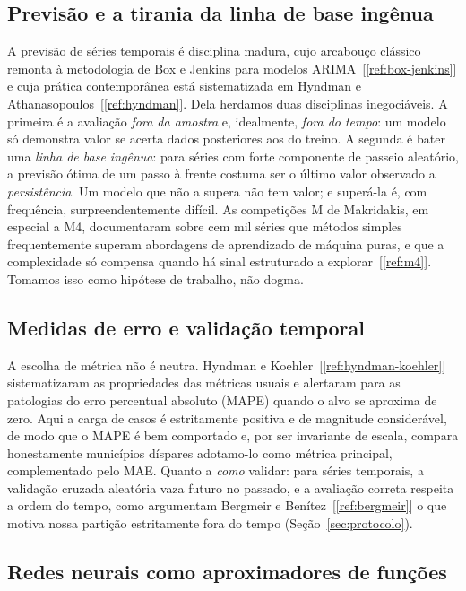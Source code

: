 \documentclass[12pt,a4paper,oneside]{article}
\newcommand{\C}[1]{[\ref{#1}]}
\begin{document}
\subsection{Previsão e a tirania da linha de base ingênua}

A previsão de séries temporais é disciplina madura, cujo arcabouço
clássico remonta à metodologia de Box e Jenkins para modelos
ARIMA~\C{ref:box-jenkins} e cuja prática contemporânea está sistematizada
em Hyndman e Athanasopoulos~\C{ref:hyndman}. Dela herdamos duas
disciplinas inegociáveis. A primeira é a avaliação \emph{fora da amostra}
e, idealmente, \emph{fora do tempo}: um modelo só demonstra valor se
acerta dados posteriores aos do treino. A segunda é bater uma \emph{linha
de base ingênua}: para séries com forte componente de passeio aleatório, a
previsão ótima de um passo à frente costuma ser o último valor observado
\textemdash{} a \emph{persistência}. Um modelo que não a supera não tem
valor; e superá-la é, com frequência, surpreendentemente difícil. As
competições M de Makridakis, em especial a M4, documentaram sobre cem mil
séries que métodos simples frequentemente superam abordagens de
aprendizado de máquina puras, e que a complexidade só compensa quando há
sinal estruturado a explorar~\C{ref:m4}. Tomamos isso como hipótese de
trabalho, não dogma.

\subsection{Medidas de erro e validação temporal}

A escolha de métrica não é neutra. Hyndman e Koehler~\C{ref:hyndman-koehler}
sistematizaram as propriedades das métricas usuais e alertaram para as
patologias do erro percentual absoluto (MAPE) quando o alvo se aproxima de
zero. Aqui a carga de casos é estritamente positiva e de magnitude
considerável, de modo que o MAPE é bem comportado e, por ser invariante de
escala, compara honestamente municípios díspares \textemdash{} adotamo-lo
como métrica principal, complementado pelo MAE. Quanto a \emph{como}
validar: para séries temporais, a validação cruzada aleatória vaza futuro
no passado, e a avaliação correta respeita a ordem do tempo, como
argumentam Bergmeir e Benítez~\C{ref:bergmeir} \textemdash{} o que motiva
nossa partição estritamente fora do tempo (Seção~\ref{sec:protocolo}).

\subsection{Redes neurais como aproximadores de funções}
\end{document}
